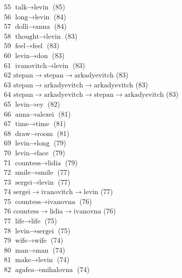 \begin{appendices}
    55  $ \text{talk} \to \text{levin} $ (85) \\
    56  $ \text{long} \to \text{levin} $ (84) \\
    57  $ \text{dolli} \to \text{anna} $ (84) \\
    58  $ \text{thought} \to \text{levin} $ (83) \\
    59  $ \text{feel} \to \text{feel} $ (83) \\
    60  $ \text{levin} \to \text{don} $ (83) \\
    61  $ \text{ivanovitch} \to \text{levin} $ (83) \\
    62  $ \text{stepan} \to \text{stepan} \to \text{arkadyevitch} $ (83) \\
    63  $ \text{stepan} \to \text{arkadyevitch} \to \text{arkadyevitch} $ (83) \\
    64  $ \text{stepan} \to \text{arkadyevitch} \to \text{stepan} \to \text{arkadyevitch} $ (83) \\
    65  $ \text{levin} \to \text{ey} $ (82) \\
    66  $ \text{anna} \to \text{alexei} $ (81) \\
    67  $ \text{time} \to \text{time} $ (81) \\
    68  $ \text{draw} \to \text{room} $ (81) \\
    69  $ \text{levin} \to \text{long} $ (79) \\
    70  $ \text{levin} \to \text{face} $ (79) \\
    71  $ \text{countess} \to \text{lidia} $ (79) \\
    72  $ \text{smile} \to \text{smile} $ (77) \\
    73  $ \text{sergei} \to \text{levin} $ (77) \\
    74  $ \text{sergei} \to \text{ivanovitch} \to \text{levin} $ (77) \\
    75  $ \text{countess} \to \text{ivanovna} $ (76) \\
    76  $ \text{countess} \to \text{lidia} \to \text{ivanovna} $ (76) \\
    77  $ \text{life} \to \text{life} $ (75) \\
    78  $ \text{levin} \to \text{sergei} $ (75) \\
    79  $ \text{wife} \to \text{wife} $ (74) \\
    80  $ \text{man} \to \text{man} $ (74) \\
    81  $ \text{make} \to \text{levin} $ (74) \\
    82  $ \text{agafea} \to \text{mihalovna} $ (74) \\

\end{appendices}
